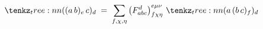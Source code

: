 \documentclass[varwidth=19cm, border=6pt]{standalone}
\begin{document}
\[
  \tntree{((a\,b)_e\,c)_d}
  \;=\;
  \sum_{f,\chi,\eta}
  \left(F^{d}_{abc}\right)^{e\mu\nu}_{f\chi\eta}\,
  \tntree{(a\,(b\,c)_f)_d}
\]
\end{document}
